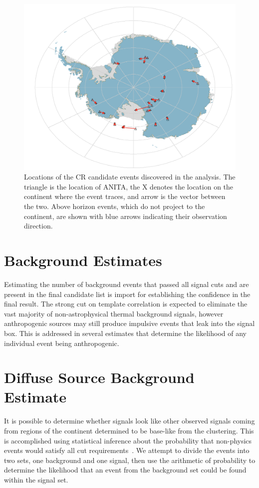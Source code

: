 			\begin{figure}
			\centering
				\includegraphics[width=\textwidth]{figures/downwardEventMap}
				\caption{Locations of the CR candidate events discovered in the analysis.  The triangle is the location of ANITA, the X denotes the location on the continent where the event traces, and arrow is the vector between the two.  Above horizon events, which do not project to the continent, are shown with blue arrows indicating their observation direction.}
			\label{fig:downwardEventMap}
			\end{figure}		

\section{Background Estimates}
	\label{sec:backgroundEstimate}
	Estimating the number of background events that passed all signal cuts and are present in the final candidate list is import for establishing the confidence in the final result.  The strong cut on template correlation is expected to eliminate the vast majority of non-astrophysical thermal background signals, however anthropogenic sources may still produce impulsive events that leak into the signal box. This is addressed in several estimates that determine the likelihood of any individual event being anthropogenic.

\section{Diffuse Source Background Estimate}
	 It is possible to determine whether signals look like other observed signals coming from regions of the continent determined to be base-like from the clustering.  This is accomplished using statistical inference about the probability that non-physics events would satisfy all cut requirements~\cite{ClassicalStatisticalEstimation}.  We attempt to divide the events into two sets, one background and one signal, then use the arithmetic of probability to determine the likelihood that an event from the background set could be found within the signal set.  

